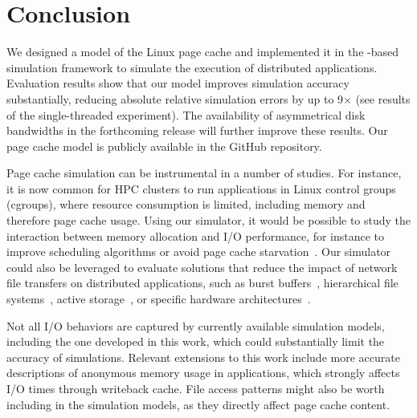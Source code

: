 \chapter{Conclusion}
\label{discussion}
We designed a model of the Linux page cache and implemented it in the
\simgrid-based \wrench simulation framework to simulate the execution
of distributed applications.
Evaluation results show that our model improves simulation accuracy
substantially, reducing absolute relative simulation errors by up to
9$\times$ (see results of the single-threaded experiment). The
availability of asymmetrical disk bandwidths in the forthcoming
\simgrid release will further improve these results.
Our page cache model is publicly available in the \wrench GitHub
repository.

Page cache simulation can be instrumental in a number of studies. For
instance, it is now common for HPC clusters to run applications in
Linux control groups (cgroups), where resource consumption is limited,
including memory and therefore page cache usage. Using our simulator,
it would be possible to study the interaction between memory allocation
and I/O performance, for instance to improve scheduling algorithms or
avoid page cache starvation~\cite{zhuang2017}. Our simulator could also
be leveraged to evaluate solutions that reduce the impact of network
file transfers on distributed applications, such as burst
buffers~\cite{ferreiradasilva-fgcs-bb-2019}, hierarchical file
systems~\cite{islam2015triple}, active storage~\cite{5496981}, or
specific hardware architectures~\cite{hayot2020performance}. 

Not all I/O behaviors are captured by currently available simulation models,
including the one developed in this work, 
which could substantially limit the accuracy of simulations.
Relevant extensions to this work include more
accurate descriptions of anonymous memory usage in applications, 
which strongly affects I/O times through writeback cache. File access patterns
 might also be worth including in the simulation models,
as they directly affect page cache content.
